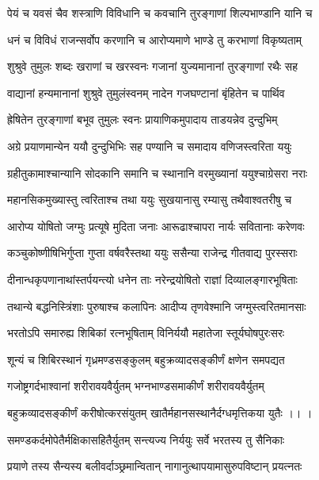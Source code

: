 \twolineshloka
{पेयं च यवसं चैव शस्त्राणि विविधानि च}
{कवचानि तुरङ्गाणां शिल्पभाण्डानि यानि च}%

\twolineshloka
{धनं च विविधं राजन्सर्वोप करणानि च}
{आरोप्यमाणे भाण्डे तु करभाणां विकृष्यताम्}%

\twolineshloka
{शुश्रुवे तुमुलः शब्दः खराणां च खरस्वनः}
{गजानां युज्यमानानां तुरङ्गाणां रथैः सह}%

\twolineshloka
{वाद्यानां हन्यमानानां शुश्रुवे तुमुलंस्वनम्}
{नादेन गजघण्टानां बृंहितेन च पार्थिव} %

\twolineshloka
{ह्रेषितेन तुरङ्गाणां बभूव तुमुलः स्वनः}
{प्रायाणिकमुपादाय ताडयन्नेव दुन्दुभिम्}%

\twolineshloka
{अग्रे प्रयाणमान्येन ययौ दुन्दुभिभिः सह}
{पण्यानि च समादाय वणिजस्त्वरिता ययुः}%

\twolineshloka
{ग्रहीतुकामाश्चान्यानि सोदकानि समानि च}
{स्थानानि वरमुख्यानां ययुश्चाग्रेसरा नराः}%

\twolineshloka
{महानसिकमुख्यास्तु त्वरिताश्च तथा ययुः}
{सुखयानासु रम्यासु तथैवाश्वतरीषु च}%

\twolineshloka
{आरोप्य योषितो जग्मुः प्रत्यूषे मुदिता जनाः}
{आरूढाश्चापरा नार्यः सवितानाः करेणवः}%

\twolineshloka
{कञ्चुकोष्णीषिभिर्गुप्ता गुप्ता वर्षवरैस्तथा}
{ययुः ससैन्या राजेन्द्र गीतवाद्य पुरस्सराः}%

\twolineshloka
{दीनान्धकृपणानाथांस्तर्पयन्त्यो धनेन ताः}
{नरेन्द्रयोषितो राज्ञां दिव्यालङ्गारभूषिताः}%

\twolineshloka
{तथान्ये बद्धनिस्त्रिंशाः पुरुषाश्च कलापिनः}
{आदीप्य तृणवेश्मानि जग्मुस्त्वरितमानसाः}%

\twolineshloka
{भरतोऽपि समारुह्य शिबिकां रत्नभूषिताम्}
{विनिर्ययौ महातेजा स्तूर्यघोषपुरःसरः}%

\twolineshloka
{शून्यं च शिबिरस्थानं गृध्रमण्डसङ्कुलम्}
{बहुक्रव्यादसङ्कीर्णं क्षणेन समपद्यत} %

\twolineshloka
{गजोष्ट्रगर्दभाश्वानां शरीरावयवैर्युतम्}
{भग्नभाण्डसमाकीर्णं शरीरावयवैर्युतम्}%

\twolineshloka
{बहुक्रव्यादसङ्कीर्णं करीषोत्करसंयुतम्}
{खातैर्महानसस्थानैर्दग्धमृत्तिकया युतैः ।। ।}%

\twolineshloka
{समण्डकर्दमोपेतैर्मक्षिकासहितैर्युतम्}
{सन्त्यज्य निर्ययुः सर्वे भरतस्य तु सैनिकाः}%

\twolineshloka
{प्रयाणे तस्य सैन्यस्य बलीवर्दाञ्छ्रमान्वितान्}
{नागानुत्थापयामासुरुपविष्टान् प्रयत्नतः}%

